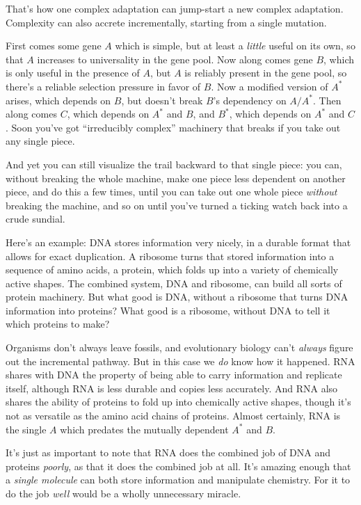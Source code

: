 {{
 That's how one complex adaptation can jump-start a
new complex adaptation. Complexity can also accrete incrementally,
starting from a single mutation.}

{
 First comes some gene $A$ which is simple, but at least a
\textit{little} useful on its own, so that $A$ increases to universality
in the gene pool. Now along comes gene $B$, which is only useful in the
presence of $A$, but $A$ is reliably present in the gene pool, so
there's a reliable selection pressure in favor of $B$.
Now a modified version of $A^{*}$ arises, which depends on
$B$, but doesn't break $B$'s dependency on
$A/A^{*}$. Then along comes $C$, which depends on
$A^{*}$ and $B$, and $B^{*}$, which depends on
$A^{*}$ and $C$. Soon you've got
``irreducibly complex'' machinery
that breaks if you take out any single piece.}

{
 And yet you can still visualize the trail backward to that single
piece: you can, without breaking the whole machine, make one piece less
dependent on another piece, and do this a few times, until you can take
out one whole piece \textit{without} breaking the machine, and so on
until you've turned a ticking watch back into a crude
sundial.}

{
 Here's an example: DNA stores information very
nicely, in a durable format that allows for exact duplication. A
ribosome turns that stored information into a sequence of amino acids,
a protein, which folds up into a variety of chemically active shapes.
The combined system, DNA and ribosome, can build all sorts of protein
machinery. But what good is DNA, without a ribosome that turns DNA
information into proteins? What good is a ribosome, without DNA to tell
it which proteins to make?}

{
 Organisms don't always leave fossils, and
evolutionary biology can't \textit{always} figure out
the incremental pathway. But in this case we \textit{do} know how it
happened. RNA shares with DNA the property of being able to carry
information and replicate itself, although RNA is less durable and
copies less accurately. And RNA also shares the ability of proteins to
fold up into chemically active shapes, though it's not
as versatile as the amino acid chains of proteins. Almost certainly,
RNA is the single $A$ which predates the mutually dependent
$A^{*}$ and $B$.}

{
 It's just as important to note that RNA does the
combined job of DNA and proteins \textit{poorly}, as that it does the
combined job at all. It's amazing enough that a
\textit{single molecule} can both store information and manipulate
chemistry. For it to do the job \textit{well} would be a wholly
unnecessary miracle.}

}
